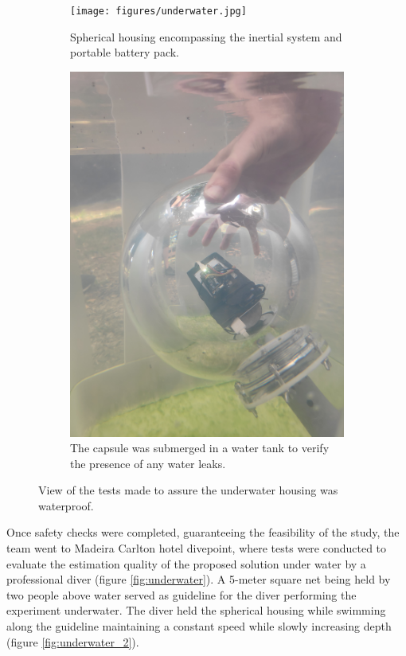 \begin{figure}[!h]
  \centering
  \begin{subfigure}{0.45\textwidth}
    \centering
    \texttt{[image: figures/underwater.jpg]}
    \caption{ Spherical housing encompassing the inertial system and portable battery pack. }
    \label{fig:underwater1_test}
  \end{subfigure}
  \begin{subfigure}{0.45\textwidth}
    \centering
    \includegraphics[width=1\textwidth]{figures/underwater_1.jpg}
    \caption{ The capsule was submerged in a water tank to verify the presence of any water leaks. }
    \label{fig:underwater2_test}
  \end{subfigure}
  \label{fig:underwater_test}
  \caption{ View of the tests made to assure the underwater housing was waterproof. }
\end{figure}

Once safety checks were completed, guaranteeing the feasibility of the study, the team went to Madeira Carlton hotel divepoint, where tests were conducted to evaluate the estimation quality of the proposed solution under water by a professional diver (figure \ref{fig:underwater}). A 5-meter square net being held by two people above water served as guideline for the diver performing the experiment underwater. The diver held the spherical housing while swimming along the guideline maintaining a constant speed while slowly increasing depth (figure \ref{fig:underwater_2}).


